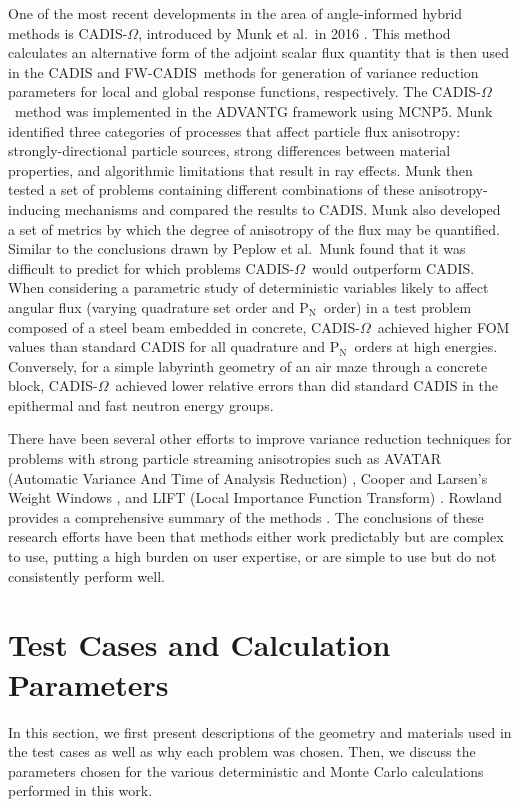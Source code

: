 \documentclass{article} %
\newcommand{\pn}{P$_\mathrm{N}$}
\newcommand{\fwc}{\mbox{FW-CADIS}}
\newcommand{\co}{\mbox{CADIS-$\Omega$}}
\begin{document}
One of the most recent developments in the area of angle-informed hybrid
methods is \co, introduced by Munk et al.\ in 2016 \cite{cadisom}. This method
calculates an alternative form of the adjoint scalar flux quantity that is
then used in the CADIS and \fwc\ methods for generation of variance reduction
parameters for local and global response functions, respectively. The \co\
method was implemented in the ADVANTG framework using MCNP5. Munk identified
three categories of processes that affect particle flux anisotropy: 
strongly-directional particle sources, strong differences between material properties,
and algorithmic limitations that result in ray effects. Munk then tested a set
of problems containing different combinations of these anisotropy-inducing
mechanisms and compared the results to CADIS. Munk also developed a set of
metrics by which the degree of anisotropy of the flux may be quantified.
Similar to the conclusions drawn by Peplow et al.\, Munk found that it was difficult
to predict for which problems \co\ would outperform CADIS. When considering a
parametric study of deterministic variables likely to affect angular flux
(varying quadrature set order and \pn\ order) in a test problem composed of a
steel beam embedded in concrete, \co\ achieved higher FOM values than standard
CADIS for all quadrature and \pn\ orders at high energies. Conversely, for a
simple labyrinth geometry of an air maze through a concrete block, \co\
achieved lower relative errors than did standard CADIS in the epithermal and
fast neutron energy groups.

There have been several other efforts to improve variance reduction techniques
for problems with strong particle streaming anisotropies such as AVATAR
(Automatic Variance And Time of Analysis Reduction) \cite{avatar}, Cooper and
Larsen's Weight Windows \cite{clww}, and LIFT (Local Importance Function
Transform) \cite{lift1, lift2}. Rowland provides a comprehensive summary of the
methods \cite{kr}. The conclusions of these research efforts have
been that methods either work predictably but are complex to use, putting a
high burden on user expertise, or are simple to use but do not consistently
perform well.

\section{Test Cases and Calculation Parameters}

In this section, we first present descriptions of the geometry and materials
used in the test cases as well as why each problem was chosen. Then, we
discuss the parameters chosen for the various deterministic and Monte Carlo
calculations performed in this work.
\end{document}
